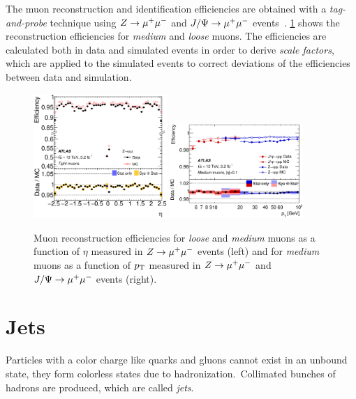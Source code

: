 The muon reconstruction and identification efficiencies are obtained with a \emph{tag-and-probe} technique using
$Z \to \mu^+\mu^-$ and $J/\Psi \to \mu^+\mu^-$ events~\cite{PERF-2015-10}.
\cref{fig:object_selection:mu_id_eff} shows the reconstruction efficiencies for \emph{medium} and \emph{loose} muons.
The efficiencies are calculated both in data and simulated events in order to derive \emph{scale factors}, which are
applied to the simulated events to correct deviations of the efficiencies between data and simulation.

\begin{figure}
    \centering
    \includegraphics[width=0.45\textwidth,align=c]{./figures/object_selection/muon_efficiency_mediumloose_zmm.eps}
    \includegraphics[width=0.45\textwidth,align=c]{./figures/object_selection/muon_efficiency_medium_zmmjpsi.eps}
    \caption{Muon reconstruction efficiencies for \emph{loose} and \emph{medium} muons as a function of $\eta$
            measured in $Z \to \mu^+\mu^-$ events (left) and for \emph{medium} muons as a function of $p_\text{T}$ measured in
            $Z \to \mu^+\mu^-$ and $J/\Psi \to \mu^+\mu^-$ events (right).~\cite{PERF-2015-10}}\label{fig:object_selection:mu_id_eff}
\end{figure}


\section{Jets}\label{sec:object_selection:jets}

Particles with a color charge like quarks and gluons cannot exist in an unbound state,
they form colorless states due to hadronization.\
Collimated bunches of hadrons are produced, which are called \emph{jets}.

